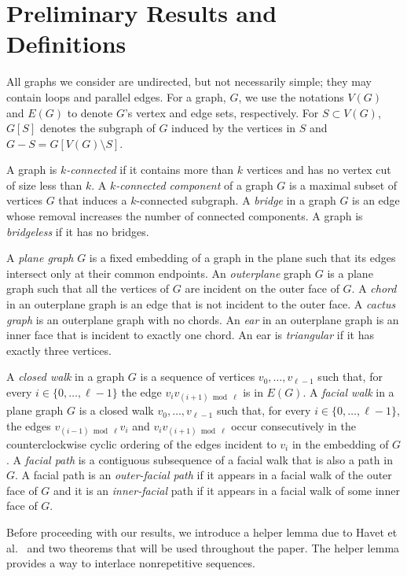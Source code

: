 \documentclass{patmorin}
\begin{document}
\section{Preliminary Results and Definitions}

All graphs we consider are undirected, but not necessarily simple;
they may contain loops and parallel edges.  For a graph, $G$, we use
the notations $V(G)$ and $E(G)$ to denote $G$'s vertex and edge sets,
respectively. For $S\subset V(G)$, $G[S]$ denotes the subgraph of $G$
induced by the vertices in $S$ and $G-S=G[V(G)\setminus S]$.

A graph is \emph{$k$-connected} if it contains more than $k$ vertices
and has no vertex cut of size less than $k$.  A \emph{$k$-connected
component} of a graph $G$ is a maximal subset of vertices $G$ that
induces a $k$-connected subgraph.  A \emph{bridge} in a graph $G$ is an
edge whose removal increases the number of connected components.
A graph is \emph{bridgeless} if it has no bridges.

A \emph{plane graph} $G$ is a fixed embedding of a graph in the
plane such that its edges intersect only at their common endpoints. An
\emph{outerplane} graph $G$ is a plane graph such that all the vertices
of $G$ are incident on the outer face of $G$. A \emph{chord} in an
outerplane graph is an edge that is not incident to the outer face. A
\emph{cactus graph} is an outerplane graph with no chords.  An \emph{ear}
in an outerplane graph is an inner face that is incident to exactly one
chord. An ear is \emph{triangular} if it has exactly three vertices.

A \emph{closed walk} in a graph $G$ is a sequence of vertices
$v_0,\ldots,v_{\ell-1}$ such that, for every $i\in\{0,\ldots,\ell-1\}$
the edge $v_iv_{(i+1)\bmod \ell}$ is in $E(G)$.  A \emph{facial walk}
in a plane graph $G$ is a closed walk $v_0,\ldots,v_{\ell-1}$ such that,
for every $i\in\{0,\ldots,\ell-1\}$, the edges $v_{(i-1)\bmod \ell} v_i$
and $v_iv_{(i+1)\bmod\ell}$ occur consecutively in the counterclockwise
cyclic ordering of the edges incident to $v_i$ in the embedding of $G$.
A \emph{facial path} is a contiguous subsequence of a facial walk that
is also a path in $G$.  A facial path is an \emph{outer-facial path}
if it appears in a facial walk of the outer face of $G$ and it is an
\emph{inner-facial} path if it appears in a facial walk of some inner
face of $G$.

Before proceeding with our results, we introduce a helper lemma
due to Havet et al.~\cite{havet2011facial} and two theorems that
will be used throughout the paper. The helper lemma provides a way to
interlace nonrepetitive sequences.
\end{document}
